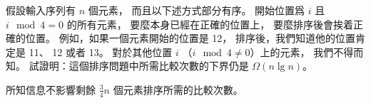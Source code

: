 \startEXERCISE
假設輸入序列有 $n$ 個元素，
而且以下述方式部分有序。
開始位置爲 $i$ 且 $i\mod 4 =0$ 的所有元素，
要麼本身已經在正確的位置上，
要麼排序後會挨着正確的位置。
例如，如果一個元素開始的位置是 12，
排序後，我們知道他的位置肯定是 11、 12 或者 13。
對於其他位置 $i$ （$i\mod 4\ne 0$）上的元素，
我們不得而知。
試證明：這個排序問題中所需比較次數的下界仍是 $\Omega(n\lg{n})$。
\stopEXERCISE

\startANSWER
所知信息不影響剩餘 $\frac{3}{4}n$ 個元素排序所需的比較次數。
\stopANSWER
